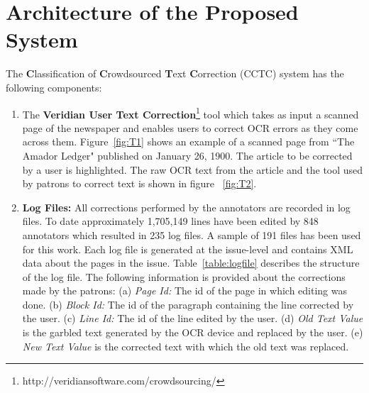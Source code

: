 \documentclass[letterpaper]{article}
\begin{document}
\section{Architecture of the Proposed System}
\label{arch}


The \textbf{C}lassification of \textbf{C}rowdsourced \textbf{T}ext \textbf{C}orrection (CCTC) system has the following components:

\begin{enumerate}

\item The \textbf{Veridian User Text Correction}\footnote{http://veridiansoftware.com/crowdsourcing/} tool which takes as input a scanned page of the newspaper and enables users to correct OCR errors as they come across them.
Figure~\ref{fig:T1} shows an example of a scanned page from ``The Amador Ledger" published on January 26, 1900. The article to be corrected by a user is highlighted. The raw OCR text from the article and the tool used by patrons to correct text is shown in figure ~\ref{fig:T2}.


\item \textbf{Log Files: }All corrections performed by the annotators are recorded in log files. To date approximately 1,705,149 lines have been edited by 848 annotators which resulted in 235 log files. A sample of 191 files has been used for this work. Each log file is generated at the issue-level and contains XML data about the pages in the issue. Table~\ref{table:logfile} describes the structure of the log file. The following information is provided about the corrections made by the patrons:
(a) \textit{Page Id: } The id of the page in which editing was done.
(b) \textit{Block Id: } The id of the paragraph containing the line corrected by the user.
(c) \textit{Line Id: }The id of the line edited by the user.
(d) \textit{Old Text Value} is the garbled text generated by the OCR device and replaced by the user.
(e) \textit{New Text Value} is the corrected text with which the old text was replaced.


\end{enumerate}
\end{document}
